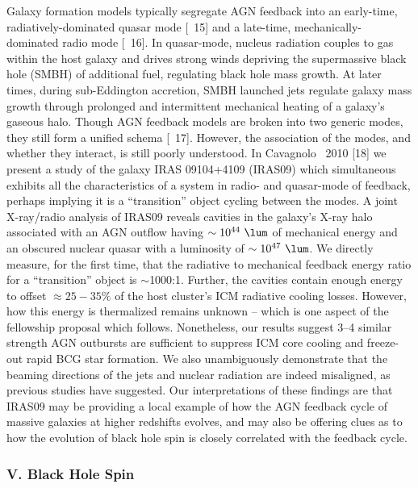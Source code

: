 \documentclass[letterpaper,12pt]{article}
\begin{document}
Galaxy formation models typically segregate AGN feedback into an
early-time, radiatively-dominated quasar mode [\eg\ 15] and a
late-time, mechanically-dominated radio mode [\eg\ 16]. In
quasar-mode, nucleus radiation couples to gas within the host galaxy
and drives strong winds depriving the supermassive black hole (SMBH)
of additional fuel, regulating black hole mass growth. At later times,
during sub-Eddington accretion, SMBH launched jets regulate galaxy
mass growth through prolonged and intermittent mechanical heating of a
galaxy's gaseous halo. Though AGN feedback models are broken into two
generic modes, they still form a unified schema [\eg\ 17]. However,
the association of the modes, and whether they interact, is still
poorly understood. In Cavagnolo \etal\ 2010 [18] we present a study of
the galaxy IRAS 09104+4109 (IRAS09) which simultaneous exhibits all
the characteristics of a system in radio- and quasar-mode of feedback,
perhaps implying it is a ``transition'' object cycling between the
modes. A joint X-ray/radio analysis of IRAS09 reveals cavities in the
galaxy's X-ray halo associated with an AGN outflow having $\sim
10^{44} ~\lum$ of mechanical energy and an obscured nuclear quasar
with a luminosity of $\sim 10^{47} ~\lum$. We directly measure, for
the first time, that the radiative to mechanical feedback energy ratio
for a ``transition'' object is $\sim$1000:1. Further, the cavities
contain enough energy to offset $\approx 25-35\%$ of the host
cluster's ICM radiative cooling losses. However, how this energy is
thermalized remains unknown -- which is one aspect of the fellowship
proposal which follows. Nonetheless, our results suggest 3--4 similar
strength AGN outbursts are sufficient to suppress ICM core cooling and
freeze-out rapid BCG star formation. We also unambiguously demonstrate
that the beaming directions of the jets and nuclear radiation are
indeed misaligned, as previous studies have suggested. Our
interpretations of these findings are that IRAS09 may be providing a
local example of how the AGN feedback cycle of massive galaxies at
higher redshifts evolves, and may also be offering clues as to how the
evolution of black hole spin is closely correlated with the feedback
cycle.

\subsubsection*{V. Black Hole Spin}
\end{document}
